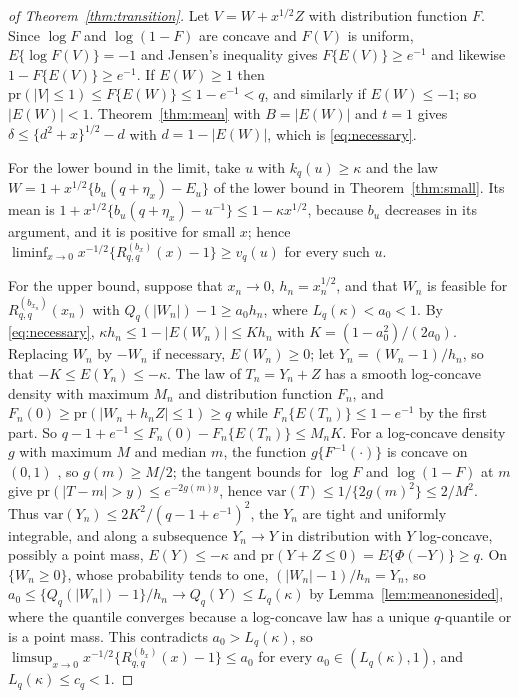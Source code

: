 \documentclass[lineno]{biometrika}
\newcommand{\pr}{\mathrm{pr}}
\newcommand{\var}{\mathrm{var}}
\begin{document}
\begin{proof}[of Theorem~\ref{thm:transition}]
Let $V = W + x^{1/2}Z$ with distribution function $F$. Since $\log F$ and $\log(1 - F)$ are concave and $F(V)$ is uniform, $E\{\log F(V)\} = -1$ and Jensen's inequality gives $F\{E(V)\} \ge e^{-1}$ and likewise $1 - F\{E(V)\} \ge e^{-1}$. If $E(W) \ge 1$ then $\pr(|V| \le 1) \le F\{E(W)\} \le 1 - e^{-1} < q$, and similarly if $E(W) \le -1$; so $|E(W)| < 1$. Theorem~\ref{thm:mean} with $B = |E(W)|$ and $t = 1$ gives $\delta \le \{d^2 + x\}^{1/2} - d$ with $d = 1 - |E(W)|$, which is \eqref{eq:necessary}.

For the lower bound in the limit, take $u$ with $k_q(u) \ge \kappa$ and the law $W = 1 + x^{1/2}\{b_u(q + \eta_x) - E_u\}$ of the lower bound in Theorem~\ref{thm:small}. Its mean is $1 + x^{1/2}\{b_u(q + \eta_x) - u^{-1}\} \le 1 - \kappa x^{1/2}$, because $b_u$ decreases in its argument, and it is positive for small $x$; hence $\liminf_{x\to0} x^{-1/2}\{R^{(b_x)}_{q,q}(x) - 1\} \ge v_q(u)$ for every such $u$.

For the upper bound, suppose that $x_n \to 0$, $h_n = x_n^{1/2}$, and that $W_n$ is feasible for $R^{(b_{x_n})}_{q,q}(x_n)$ with $Q_q(|W_n|) - 1 \ge a_0 h_n$, where $L_q(\kappa) < a_0 < 1$. By \eqref{eq:necessary}, $\kappa h_n \le 1 - |E(W_n)| \le K h_n$ with $K = (1 - a_0^2)/(2a_0)$. Replacing $W_n$ by $-W_n$ if necessary, $E(W_n) \ge 0$; let $Y_n = (W_n - 1)/h_n$, so that $-K \le E(Y_n) \le -\kappa$. The law of $T_n = Y_n + Z$ has a smooth log-concave density with maximum $M_n$ and distribution function $F_n$, and $F_n(0) \ge \pr(|W_n + h_nZ| \le 1) \ge q$ while $F_n\{E(T_n)\} \le 1 - e^{-1}$ by the first part. So $q - 1 + e^{-1} \le F_n(0) - F_n\{E(T_n)\} \le M_n K$. For a log-concave density $g$ with maximum $M$ and median $m$, the function $g\{F^{-1}(\cdot)\}$ is concave on $(0,1)$ \citep{bobkov1996}, so $g(m) \ge M/2$; the tangent bounds for $\log F$ and $\log(1-F)$ at $m$ give $\pr(|T - m| > y) \le e^{-2g(m)y}$, hence $\var(T) \le 1/\{2g(m)^2\} \le 2/M^2$. Thus $\var(Y_n) \le 2K^2/(q - 1 + e^{-1})^2$, the $Y_n$ are tight and uniformly integrable, and along a subsequence $Y_n \to Y$ in distribution with $Y$ log-concave, possibly a point mass, $E(Y) \le -\kappa$ and $\pr(Y + Z \le 0) = E\{\Phi(-Y)\} \ge q$. On $\{W_n \ge 0\}$, whose probability tends to one, $(|W_n| - 1)/h_n = Y_n$, so $a_0 \le \{Q_q(|W_n|) - 1\}/h_n \to Q_q(Y) \le L_q(\kappa)$ by Lemma~\ref{lem:meanonesided}, where the quantile converges because a log-concave law has a unique $q$-quantile or is a point mass. This contradicts $a_0 > L_q(\kappa)$, so $\limsup_{x\to0} x^{-1/2}\{R^{(b_x)}_{q,q}(x) - 1\} \le a_0$ for every $a_0 \in (L_q(\kappa), 1)$, and $L_q(\kappa) \le c_q < 1$.
\end{proof}



\end{document}
